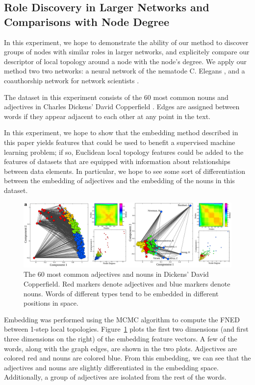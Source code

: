 \documentclass{article}
\begin{document}
\subsection{Role Discovery in Larger Networks and Comparisons with Node Degree}
In this experiment, we hope to demonstrate the ability of our method to discover groups of nodes with similar roles in larger networks, and explicitely compare our descriptor of local topology around a node with the node's degree. We apply our method two two networks: a neural network of the nematode C. Elegans \cite{pujol2001reverse,watts1998collective}, and a coauthorship network for network scientists \cite{newman2006finding}.


The dataset in this experiment consists of the 60 most common nouns and adjectives in Charles Dickens' David Copperfield \cite{newman2006finding}. Edges are assigned between words if they appear adjacent to each other at any point in the text.

In this experiment, we hope to show that the embedding method described in this paper yields features that could be used to benefit a supervised machine learning problem; if so, Euclidean local topology features could be added to the features of datasets that are equipped with information about relationships between data elements. In particular, we hope to see some sort of differentiation between the embedding of adjectives and the embedding of the nouns in this dataset.

\begin{figure}[h!tbp]
  \centering               
  \includegraphics[width=1\textwidth]{fig/fig5.pdf}
  \caption{The 60 most common adjectives and nouns in Dickens' David Copperfield. Red markers denote adjectives and blue markers denote nouns. Words of different types tend to be embedded in different positions in space.}
  \label{fig:dickensCopperfield}
\end{figure}

Embedding was performed using the MCMC algorithm to compute the FNED between 1-step local topologies. Figure~\ref{fig:dickensCopperfield} plots the first two dimensions (and first three dimensions on the right) of the embedding feature vectors. A few of the words, along with the graph edges, are shown in the two plots. Adjectives are colored red and nouns are colored blue. From this embedding, we can see that the adjectives and nouns are slightly differentiated in the embedding space. Additionally, a group of adjectives are isolated from the rest of the words.
\end{document}

